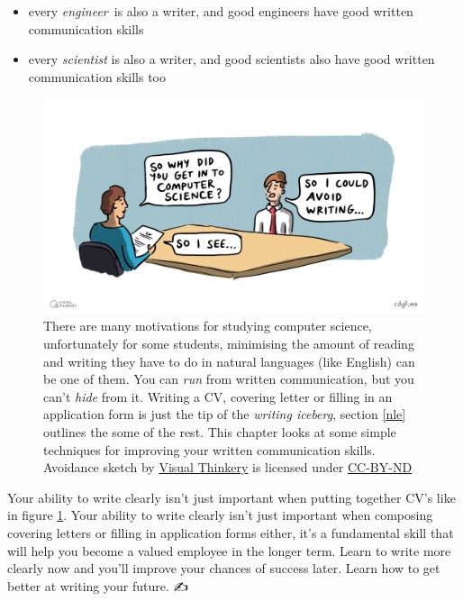\documentclass[
]{book}
\providecommand{\tightlist}{%
  \setlength{\itemsep}{0pt}\setlength{\parskip}{0pt}}
\begin{document}
\begin{itemize}
\tightlist
\item
  every \emph{engineer}~is also a writer, and good engineers have good written communication skills
\item
  every \emph{scientist} is also a writer, and good scientists also have good written communication skills too
\end{itemize}

\begin{figure}

{\centering \includegraphics[width=1\linewidth]{images/Avoiding writing} 

}

\caption{There are many motivations for studying computer science, unfortunately for some students, minimising the amount of reading and writing they have to do in natural languages (like English) can be one of them. You can \emph{run} from written communication, but you can't \emph{hide} from it. Writing a CV, covering letter or filling in an application form is just the tip of the \emph{writing iceberg}, section \ref{nle} outlines the some of the rest. This chapter looks at some simple techniques for improving your written communication skills. Avoidance sketch by \href{https://visualthinkery.com}{Visual Thinkery} is licensed under \href{https://creativecommons.org/licenses/by-nd/4.0/}{CC-BY-ND}}\label{fig:no-writing-fig}
\end{figure}



Your ability to write clearly isn't just important when putting together CV's like in figure \ref{fig:no-writing-fig}. Your ability to write clearly isn't just important when composing covering letters or filling in application forms either, it's a fundamental skill that will help you become a valued employee in the longer term. Learn to write more clearly now and you'll improve your chances of success later. Learn how to get better at writing your future. ✍️
\end{document}
